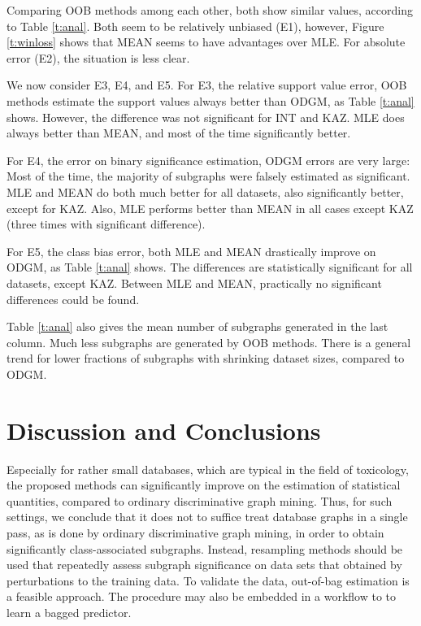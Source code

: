 \documentclass{sig-alternate}
\begin{document}
Comparing OOB methods among each other, both show
similar values, according to Table \ref{t:anal}. Both seem to be relatively
unbiased (E1), however, Figure \ref{t:winloss} shows that MEAN seems to have
advantages over MLE. For absolute error (E2), the situation is less clear. 

We now consider E3, E4, and E5. 
For E3, the relative support value error,
OOB methods estimate the support values always better than ODGM, as Table \ref{t:anal} shows. However, the difference was not significant for INT and KAZ.
MLE does always better than MEAN, and most of the time significantly better.

For E4, the error on binary significance estimation, ODGM errors are very large:
Most of the time, the majority of subgraphs were falsely estimated as significant. 
MLE and MEAN do both much better for all datasets, also significantly better, except for KAZ. 
Also, MLE performs better than MEAN in
all cases except KAZ (three times with significant difference). 

For E5, the class bias error, both MLE and MEAN drastically improve on ODGM, as
Table \ref{t:anal} shows. The differences
are statistically significant for all datasets, except KAZ. Between MLE and MEAN, practically no significant differences could be found.

Table \ref{t:anal} also gives the mean number of subgraphs generated in the
last column. Much less subgraphs are generated by OOB methods. 
There is a general trend for lower fractions of subgraphs
with shrinking dataset sizes, compared to ODGM. 


\section{Discussion and Conclusions}
\label{s:Conclusion}
Especially for rather small databases, which are typical in the field of
toxicology, the proposed methods can significantly improve on the estimation of
statistical quantities, compared to ordinary discriminative graph mining. 
Thus, for such settings, we conclude that it does not to suffice treat database graphs in a single pass, as is
done by ordinary discriminative graph mining, in order to obtain significantly class-associated
subgraphs. Instead, resampling methods
should be used that repeatedly assess subgraph significance on data sets that obtained by perturbations to the training data. To validate the
data, out-of-bag estimation is a feasible approach. The procedure may also be
embedded in a workflow to to learn a bagged predictor.
\end{document}
